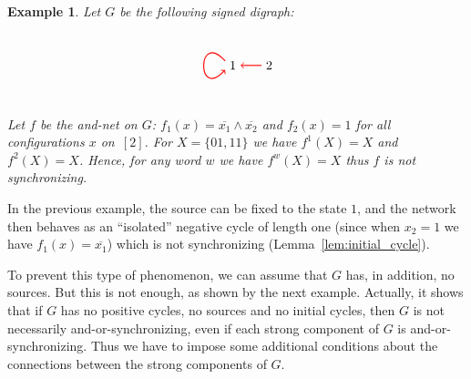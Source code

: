 \documentclass[11pt,letter]{article}
\newtheorem{example}{Example}
\begin{document}
\begin{example}
Let $G$ be the following signed digraph:
\[
\begin{tikzpicture}
\node (1) at (0,0){$1$};
\node (2) at (1,0){$2$};
\draw[thick,->,red] (1.150) .. controls (-1,+1) and (-1,-1) .. (1.210);
\path[thick,->]
(2) edge[red] (1)
;
\end{tikzpicture}
\]
Let $f$ be the and-net on $G$: $f_1(x)=\overline{x_1}\land \overline{x_2}$ and $f_2(x)=1$ for all configurations $x$ on~$[2]$. For $X=\{01,11\}$ we have $f^1(X)=X$ and $f^2(X)=X$. Hence, for any word $w$ we have $f^w(X)=X$ thus $f$ is not synchronizing.  
\end{example}

In the previous example, the source can be fixed to the state $1$, and the network then behaves as an ``isolated'' negative cycle of length one (since when $x_2=1$ we have $f_1(x)=\overline{x_1}$) which is not synchronizing (Lemma~\ref{lem:initial_cycle}). 

\medskip
To prevent this type of phenomenon, we can assume that $G$ has, in addition, no sources. But this is not enough, as shown by the next example. Actually, it shows that if $G$ has no positive cycles, no sources and no initial cycles, then $G$ is not necessarily and-or-synchronizing, even if each strong component of $G$ is and-or-synchronizing. Thus we have to impose some additional conditions about the connections between the strong components of $G$. 
\end{document}
